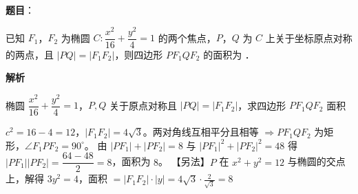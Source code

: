 \begin{answer}

\textbf{题目}：

已知 $F_1$，$F_2$ 为椭圆 $C:\dfrac{x^{2}}{16}+\dfrac{y^{2}}4=1$ 的两个焦点，$P$，$Q$ 为 $C$ 上关于坐标原点对称的两点，且 $|PQ|=|F_1F_2|$，则四边形 $PF_1QF_2$ 的面积为 \gkblank{}．

\textbf{解析}

椭圆 $\dfrac{x^2}{16}+\dfrac{y^2}4=1$，$P,Q$ 关于原点对称且 $|PQ|=|F_1F_2|$，求四边形 $PF_1QF_2$ 面积

$c^2=16-4=12$，$|F_1F_2|=4\sqrt3$。两对角线互相平分且相等 $\Rightarrow PF_1QF_2$ 为矩形，$\angle F_1PF_2=90^\circ$。
由 $|PF_1|+|PF_2|=8$ 与 $|PF_1|^2+|PF_2|^2=48$ 得 $|PF_1||PF_2|=\dfrac{64-48}2=8$，面积为 $8$。
【另法】$P$ 在 $x^2+y^2=12$ 与椭圆的交点上，解得 $3y^2=4$，面积 $=|F_1F_2|\cdot|y|=4\sqrt3\cdot\tfrac2{\sqrt3}=8$ 


\par\medskip

\end{answer}

